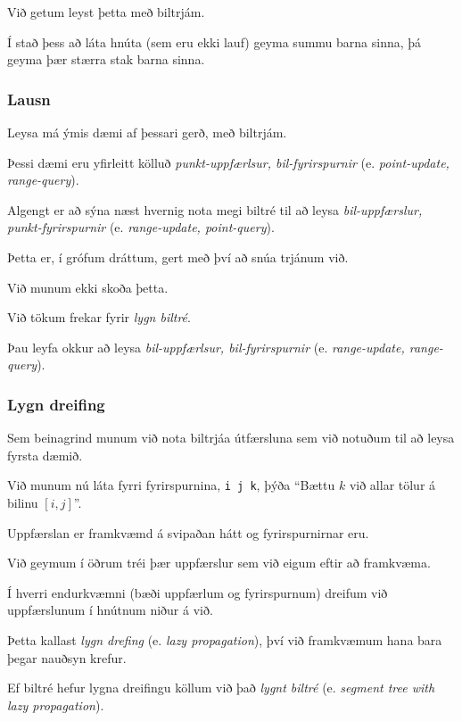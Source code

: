 {
	{
		\item<1-> Við getum leyst þetta með biltrjám.
		\item<2-> Í stað þess að láta hnúta (sem eru ekki lauf) geyma summu barna sinna, þá geyma þær stærra stak barna sinna.
	}
}

{
	\frametitle{Lausn}
}

{
	{
		\item<1-> Leysa má ýmis dæmi af þessari gerð, með biltrjám.
		\item<2-> Þessi dæmi eru yfirleitt kölluð \emph{punkt-uppfærlsur, bil-fyrirspurnir} (e. \emph{point-update, range-query}).
		\item<3-> Algengt er að sýna næst hvernig nota megi biltré til að leysa \emph{bil-uppfærslur, punkt-fyrirspurnir}
					(e. \emph{range-update, point-query}).
		\item<4-> Þetta er, í grófum dráttum, gert með því að snúa trjánum við.
		\item<5-> Við munum ekki skoða þetta.
		\item<6-> Við tökum frekar fyrir \emph{lygn biltré}.
		\item<7-> Þau leyfa okkur að leysa \emph{bil-uppfærlsur, bil-fyrirspurnir} (e. \emph{range-update, range-query}).
	}
}

{
	\frametitle{Lygn dreifing}
	{
		\item<1-> Sem beinagrind munum við nota biltrjáa útfærsluna sem við notuðum til að leysa fyrsta dæmið.
		\item<2-> Við munum nú láta fyrri fyrirspurnina, \texttt{i j k}, þýða ``Bættu $k$ við allar tölur á bilinu $[i, j]$''.
		\item<3-> Uppfærslan er framkvæmd á svipaðan hátt og fyrirspurnirnar eru.
		\item<4-> Við geymum í öðrum tréi þær uppfærslur sem við eigum eftir að framkvæma.
		\item<5-> Í hverri endurkvæmni (bæði uppfærlum og fyrirspurnum) dreifum við uppfærslunum í hnútnum niður á við.
		\item<6-> Þetta kallast \emph{lygn drefing} (e. \emph{lazy propagation}), því við framkvæmum hana bara þegar nauðsyn krefur.
		\item<7-> Ef biltré hefur lygna dreifingu köllum við það \emph{lygnt biltré} (e. \emph{segment tree with lazy propagation}).
	}
}

